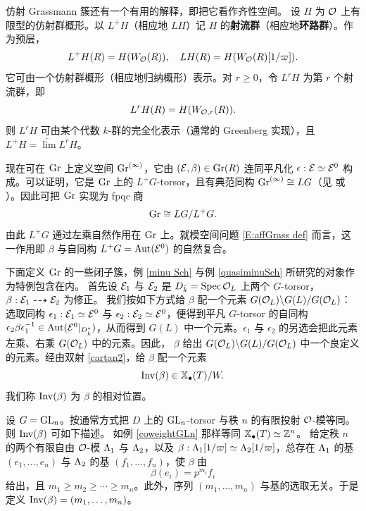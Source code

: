 仿射 Grassmann 簇还有一个有用的解释，即把它看作齐性空间。
设 $H$ 为 ${\mathcal O}$ 上有限型的仿射群概形。以 $L^+H$（相应地 $LH$）记 $H$ 的\textbf{射流群}（相应地\textbf{环路群}）。作为预层，
\begin{equation*}\label{E:jet and loop}
L^+H(R)=H(W_{\mathcal O}(R)),\quad LH(R)=H(W_{\mathcal O}(R)[1/\varpi]).
\end{equation*}
它可由一个仿射群概形（相应地归纳概形）表示。对 $r\geq 0$，令 $L^rH$ 为第 $r$ 个射流群，即
\begin{equation*}\label{E:rjet}
L^rH(R)=H(W_{{\mathcal O},r}(R)).
\end{equation*} 
则 $L^rH$ 可由某个代数 $k$-群的完全化表示（通常的 Greenberg 实现），且 $L^+H=\underleftarrow\lim L^rH$。

现在可在 ${\operatorname{Gr}}$ 上定义空间 ${\operatorname{Gr}}^{(\infty)}$，它由 $({\mathcal E},\beta)\in {\operatorname{Gr}}(R)$ 连同平凡化 $\epsilon:{\mathcal E}\simeq {\mathcal E}^0$ 构成。可以证明，它是 ${\operatorname{Gr}}$ 上的 $L^+G$-torsor，且有典范同构 ${\operatorname{Gr}}^{(\infty)}\cong LG$（见 \cite[引理 1.3]{Zh1} 或 \cite[命题 1.3.6]{Zh2}）。因此可把 ${\operatorname{Gr}}$ 实现为 fpqc 商
\begin{equation}
\label{E:gr as quotient}
{\operatorname{Gr}}\cong LG/L^+G.
\end{equation}
由此 $L^+G$ 通过左乘自然作用在 ${\operatorname{Gr}}$ 上。就模空间问题 \eqref{E:affGrass def} 而言，这一作用即 $\beta$ 与自同构 $L^+G={\operatorname{Aut}}({\mathcal E}^0)$ 的自然复合。
\medskip

 
下面定义 ${\operatorname{Gr}}$ 的一些闭子簇，例 \ref{minu Sch} 与例 \ref{quasiminuSch} 所研究的对象作为特例包含在内。
首先设 ${\mathcal E}_1$ 与 ${\mathcal E}_2$ 是 $D_{\bar k}=\operatorname{Spec} {\mathcal O}_L$ 上两个 $G$-torsor，$\beta: {\mathcal E}_1\dashrightarrow {\mathcal E}_2$ 为修正。
我们按如下方式给 $\beta$ 配一个元素
$G({\mathcal O}_L)\backslash G(L)/G({\mathcal O}_L)$：选取同构 $\epsilon_1:{\mathcal E}_1\simeq {\mathcal E}^0$ 与 $\epsilon_2:{\mathcal E}_2\simeq {\mathcal E}^0$，便得到平凡 $G$-torsor 的自同构 $\epsilon_2\beta\epsilon_1^{-1}\in {\operatorname{Aut}}({\mathcal E}^0|_{D_{\bar k}^*})$，从而得到 $G(L)$ 中一个元素。$\epsilon_1$ 与 $\epsilon_2$ 的另选会把此元素左乘、右乘 $G({\mathcal O}_L)$ 中的元素。因此，
$\beta$ 给出 $G({\mathcal O}_L)\backslash G(L)/G({\mathcal O}_L)$ 中一个良定义的元素。经由双射 \eqref{cartan2}，给 $\beta$ 配一个元素
\[{\operatorname{Inv}}(\beta)\in \mathbb{X}_\bullet(T)/W.\]
我们称 ${\operatorname{Inv}}(\beta)$ 为 $\beta$ 的相对位置。
\begin{ex}\label{invbetaGLn}
设 $G={\operatorname{GL}}_n$。按通常方式把 $D$ 上的 ${\operatorname{GL}}_n$-torsor 与秩 $n$ 的有限投射 ${\mathcal O}$-模等同。则 ${\operatorname{Inv}}(\beta)$ 可如下描述。
如例 \ref{coweightGLn} 那样等同 $\mathbb{X}_\bullet(T)\simeq {\mathbb Z}^n$。
给定秩 $n$ 的两个有限自由 ${\mathcal O}$-模 ${\Lambda}_1$ 与 ${\Lambda}_2$，以及 $\beta: {\Lambda}_1[1/\varpi]\simeq {\Lambda}_2[1/\varpi]$，总存在 ${\Lambda}_1$ 的基 $(e_1,\ldots,e_n)$ 与 ${\Lambda}_2$ 的基 $(f_1,\ldots,f_n)$，使 $\beta$ 由
$$\beta(e_i)=p^{m_i}f_i$$ 
给出，且 $m_1\geq m_2\geq\cdots\geq m_n$。此外，序列 $(m_1,\ldots,m_n)$ 与基的选取无关。于是定义 ${\operatorname{Inv}}(\beta)=(m_1,\ldots,m_n)$。
\end{ex}
